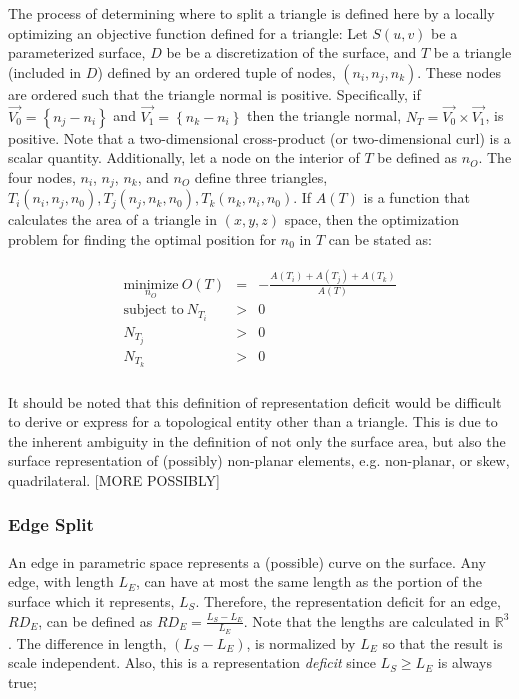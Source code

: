 The process of determining where to split a triangle is defined here by
a locally optimizing an objective function defined for a triangle: Let
$S(u,v)$ be a parameterized surface, $D$ be be a discretization of the
surface, and $T$ be a triangle (included in $D$) defined by an ordered
tuple of nodes, $\left(n_i, n_j, n_k\right)$. These nodes are ordered
such that the triangle normal is positive. Specifically, if $\vec{V_0} =
\left\{n_j - n_i \right\}$ and $\vec{V_1} = \left\{n_k - n_i\right\}$
then the triangle normal, $N_T = \vec{V_0} \times \vec{V_1}$, is
positive. Note that a two-dimensional cross-product (or two-dimensional
curl) is a scalar quantity. Additionally, let a node on the interior of
$T$ be defined as $n_O$. The four nodes, $n_i$, $n_j$, $n_k$, and $n_O$
define three triangles, $T_i\left(n_i,n_j,n_0\right), T_j\left(n_j, n_k,
n_0\right), T_k\left(n_k, n_i, n_0\right)$. If $A(T)$ is a function
that calculates the area of a triangle in $\left(x,y,z\right)$ space,
then the optimization problem for finding the optimal position for $n_0$
in $T$ can be stated as:

\begin{eqnarray*}
\begin{array}{rcl}
\underset{n_O}{\text{minimize}} \ O(T) & = & - \frac{A\left(T_i\right) + A\left(T_j\right) + A\left(T_k\right) }{ A\left(T\right) }\\
\text{subject to} \ N_{T_i} & > & 0 \\
N_{T_j} & > & 0 \\ 
N_{T_k} & > & 0 \\
\end{array}
\end{eqnarray*}

It should be noted that this definition of representation deficit would be difficult to derive or express for a topological entity other than a triangle. This is due to the inherent ambiguity in the definition of not only the surface area, but also the surface representation of (possibly) non-planar elements, e.g. non-planar, or skew, quadrilateral. [MORE POSSIBLY]

\subsubsection{Edge Split}
An edge in parametric space represents a (possible) curve on the
surface. Any edge, with length $L_E$, can have at most the same length
as the portion of the surface which it represents, $L_S$. Therefore, the
representation deficit for an edge, $RD_E$, can be defined as $RD_E =
\frac{L_S - L_E}{L_E}$. Note that the lengths are calculated in
${\mathbb R}^3$. The difference in length, $\left(L_S - L_E\right)$, is
normalized by $L_E$ so that the result is scale independent. Also, this
is a representation {\it deficit} since $L_S \ge L_E$ is always true;

